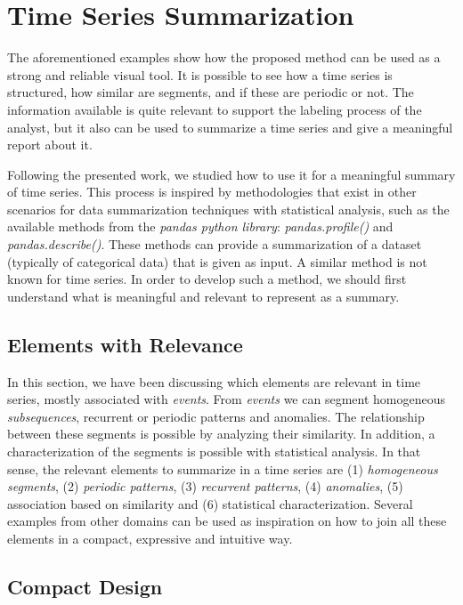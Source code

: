 {\section{Time Series Summarization}

The aforementioned examples show how the proposed method can be used as a strong and reliable visual tool. It is possible to see how a time series is structured, how similar are segments, and if these are periodic or not. The information available is quite relevant to support the labeling process of the analyst, but it also can be used to summarize a time series and give a meaningful report about it. 
\par
Following the presented work, we studied how to use it for a meaningful summary of time series. This process is inspired by methodologies that exist in other scenarios for data summarization techniques with statistical analysis, such as the available methods from the \textit{pandas python library}: \textit{pandas.profile()} and \textit{pandas.describe()}. These methods can provide a summarization of a dataset (typically of categorical data) that is given as input. A similar method is not known for time series. In order to develop such a method, we should first understand what is meaningful and relevant to represent as a summary.

\subsection{Elements with Relevance}

In this section, we have been discussing which elements are relevant in time series, mostly associated with \textit{events}. From \textit{events} we can segment homogeneous \textit{subsequences}, recurrent or periodic patterns and anomalies. The relationship between these segments is possible by analyzing their similarity. In addition, a characterization of the segments is possible with statistical analysis. In that sense, the relevant elements to summarize in a time series are (1) \textit{homogeneous segments}, (2) \textit{periodic patterns}, (3) \textit{recurrent patterns}, (4) \textit{anomalies}, (5) association based on similarity and (6) statistical characterization. Several examples from other domains can be used as inspiration on how to join all these elements in a compact, expressive and intuitive way.

\subsection{Compact Design}

}

